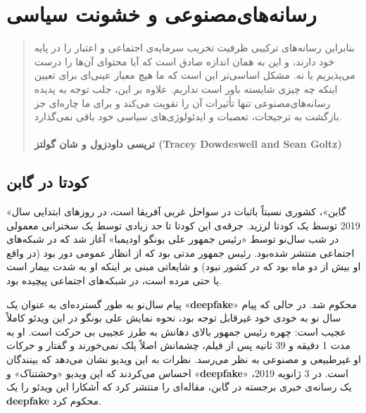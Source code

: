 

\chapter{رسانه‌های‌مصنوعی و خشونت سیاسی}
\label{ch:رسانه‌های‌مصنوعی و خشونت سیاسی}

\begin{quote}
    بنابراین رسانه‌های ترکیبی ظرفیت تخریب سرمایه‌ی اجتماعی و اعتبار را در پایه خود دارند، و این به همان اندازه صادق است که آیا محتوای آن‌ها را درست می‌پذیریم یا نه.
    مشکل اساسی‌تر این است که ما هیچ معیار عینی‌ای برای تعیین اینکه چه چیزی شایسته باور است نداریم.
    علاوه بر این، جلب توجه به پدیده رسانه‌های‌مصنوعی تنها تأثیرات آن را تقویت می‌کند و برای ما چاره‌ای جز بازگشت به ترجیحات، تعصبات و ایدئولوژی‌های سیاسی خود باقی نمی‌گذارد.
    \\\\
    \textbf{تریسی داودزول و شان گولتز \textenglish{\textbf{(Tracey Dowdeswell and Sean Goltz)}}}
    \newline
\end{quote}


{
\section*{کودتا در گابن}
\label{sec:کودتا در گابن}
«گابن»، کشوری نسبتاً باثبات در سواحل غربی آفریقا است، در روزهای ابتدایی سال 2019 توسط یک کودتا لرزید. جرقه‌ی این کودتا تا حد زیادی توسط یک سخنرانی معمولی در شب سال‌نو توسط «رئیس جمهور علی بونگو اودیمبا» آغاز شد که در شبکه‌های اجتماعی منتشر شده‌بود. رئیس جمهور مدتی بود که از انظار عمومی دور بود (در واقع او بیش از دو ماه بود که در کشور نبود) و شایعاتی مبنی بر اینکه او به شدت بیمار است یا حتی مرده است، در شبکه‌های اجتماعی پیچیده بود.
}



پیام سال‌نو به طور گسترده‌ای به عنوان یک «\textenglish{\textbf{deepfake}}» محکوم شد.
در حالی که پیام سال نو به خودی خود غیرقابل توجه بود، نحوه نمایش علی بونگو در این ویدئو کاملاً عجیب است: چهره رئیس جمهور بالای دهانش به طرز عجیبی بی حرکت است.
او به مدت 1 دقیقه و 39 ثانیه پس از فیلم، چشمانش اصلاً پلک نمی‌خورند و گفتار و حرکات او غیرطبیعی و مصنوعی به نظر می‌رسد.
نظرات به این ویدیو نشان می‌دهد که بینندگان احساس می‌کردند که این ویدیو «وحشتناک» و «\textenglish{\textbf{deepfake}}» است.
در 3 ژانویه 2019، یک رسانه‌ی خبری برجسته در گابن، مقاله‌ای را منتشر کرد که آشکارا این ویدئو را یک \textenglish{\textbf{deepfake}} محکوم کرد.

